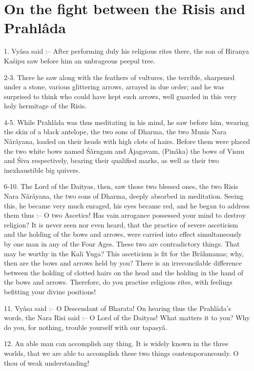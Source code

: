 ﻿\chapter{On the fight between the Risis and Prahl\^ada}

1. Vy\^asa said :-- After performing duly his religious rites there, the son of Hiranya Ka\'sipu saw before him an unbrageous peepul tree.

2-3. There he saw along with the feathers of vultures, the terrible, sharpened under a stone, various glittering arrows, arrayed in due order; and he was surprised to think who could have kept such arrows, well guarded in this very holy hermitage of the Risis.

4-5. While Prahl\^ada was thus meditating in his mind, he saw before him, wearing the skin of a black antelope, the two sons of Dharma, the two Munis Nara N\^ar\^ayana, loaded on their heads with high clots of hairs. Before them were placed the two white bows named \'S\^arngam and \^Ajagavam, (Pin\^aka) the bows of Visnu and \'Siva respectively, bearing their qualified marks, as well as their two inexhaustible big quivers.

6-10. The Lord of the Daityas, then, saw those two blessed ones, the two Risis Nara N\^ar\^ayana, the two sons of Dharma, deeply absorbed in meditation. Seeing this, he became very much enraged, his eyes became red, and he began to address them thus :-- O two Ascetics! Has vain arrogance possessed your mind to destroy religion? It is never seen nor even heard, that the practice of severe asceticism and the holding of the bows and arrows, were carried into effect simultaneously by one man in any of the Four Ages. These two are contradictory things. That may be worthy in the Kali Yuga? This asceticism is fit for the Br\^ahmanas; why, then are the bows and arrows held by you? There is an irreconcilable difference between the holding of clotted hairs on the head and the holding in the hand of the bows and arrows. Therefore, do you practise religious rites, with feelings befitting your divine positions!

11. Vy\^asa said :-- O Descendant of Bharata! On hearing thus the Prahl\^ada's words, the Nara Risi said :-- O Lord of the Daityas! What matters it to you? Why do you, for nothing, trouble yourself with our tapasy\^a.

12. An able man can accomplish any thing. It is widely known in the three worlds, that we are able to accomplish these two things contemporaneously. O thou of weak understanding!

